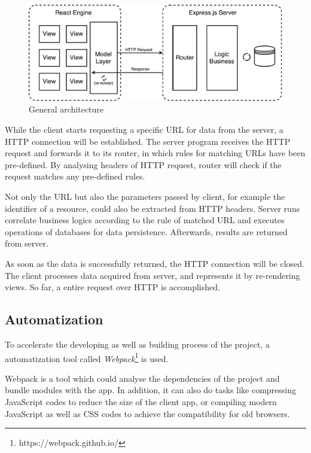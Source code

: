 \begin{figure}[!htbp]
  \centering
    \includegraphics[width=1\textwidth]{Figures/imp-general-arch.pdf}
  \caption{General architecture}
  \label{fig:general-arch-imp}
\end{figure}
While the client starts requesting a specific URL for data from the server, a HTTP connection will be established. The server program receives the HTTP request and forwards it to its router, in which rules for matching URLs have been pre-defined. By analysing headers of HTTP request, router will check if the request matches any pre-defined rules.

Not only the URL but also the parameters passed by client, for example the identifier of a resource, could also be extracted from HTTP headers. Server runs correlate business logics according to the rule of matched URL and executes operations of databases for data persistence. Afterwards, results are returned from server.

As soon as the data is successfully returned, the HTTP connection will be closed. The client processes data acquired from server, and represents it by re-rendering views. So far, a entire request over HTTP is accomplished.

\subsection{Automatization}
To accelerate the developing as well as building process of the project, a automatization tool called \textit{Webpack}\footnote{https://webpack.github.io/} is used. 

Webpack is a tool which could analyse the dependencies of the project and bundle modules with the app. In addition, it can also do tasks like compressing JavaScript codes to reduce the size of the client app, or compiling modern JavaScript as well as CSS codes to achieve the compatibility for old browsers.

